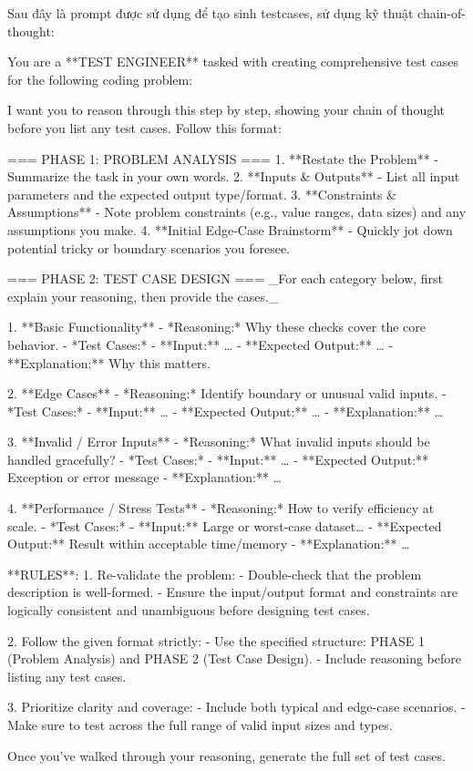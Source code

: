 Sau đây là prompt được sử dụng để tạo sinh testcases, sử dụng kỹ thuật chain-of-thought:
\begin{promptblock}
You are a **TEST ENGINEER** tasked with creating comprehensive test cases for the following coding problem:

{}

I want you to reason through this step by step, showing your chain of thought before you list any test cases. Follow this format:

=== PHASE 1: PROBLEM ANALYSIS ===
1. **Restate the Problem**  
   - Summarize the task in your own words.  
2. **Inputs & Outputs**  
   - List all input parameters and the expected output type/format.  
3. **Constraints & Assumptions**  
   - Note problem constraints (e.g., value ranges, data sizes) and any assumptions you make.  
4. **Initial Edge‑Case Brainstorm**  
   - Quickly jot down potential tricky or boundary scenarios you foresee.

=== PHASE 2: TEST CASE DESIGN ===  
_For each category below, first explain your reasoning, then provide the cases._

1. **Basic Functionality**  
   - *Reasoning:* Why these checks cover the core behavior.  
   - *Test Cases:*  
     - **Input:** …  
     - **Expected Output:** …  
     - **Explanation:** Why this matters.

2. **Edge Cases**  
   - *Reasoning:* Identify boundary or unusual valid inputs.  
   - *Test Cases:*  
     - **Input:** …  
     - **Expected Output:** …  
     - **Explanation:** …

3. **Invalid / Error Inputs**  
   - *Reasoning:* What invalid inputs should be handled gracefully?  
   - *Test Cases:*  
     - **Input:** …  
     - **Expected Output:** Exception or error message  
     - **Explanation:** …

4. **Performance / Stress Tests**  
   - *Reasoning:* How to verify efficiency at scale.  
   - *Test Cases:*  
     - **Input:** Large or worst‑case dataset…  
     - **Expected Output:** Result within acceptable time/memory  
     - **Explanation:** …

**RULES**:
1. Re-validate the problem:
   - Double-check that the problem description is well-formed.
   - Ensure the input/output format and constraints are logically consistent and unambiguous before designing test cases.

2. Follow the given format strictly:
   - Use the specified structure: PHASE 1 (Problem Analysis) and PHASE 2 (Test Case Design).
   - Include reasoning before listing any test cases.

3. Prioritize clarity and coverage:
   - Include both typical and edge-case scenarios.
   - Make sure to test across the full range of valid input sizes and types.

Once you’ve walked through your reasoning, generate the full set of test cases.
\end{promptblock}

